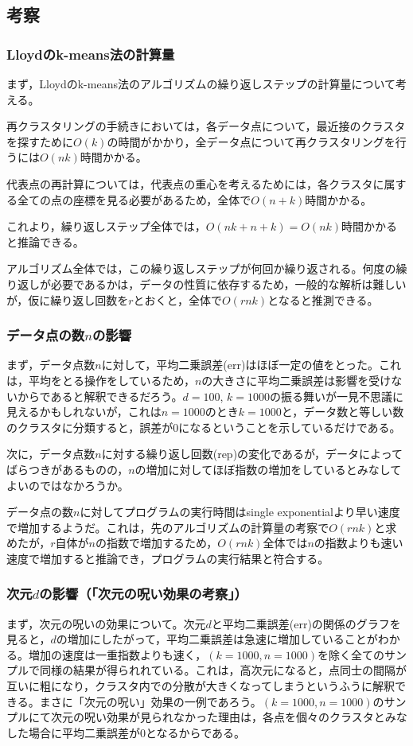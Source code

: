 \documentclass[10pt,a4,uplatex]{jsarticle}
\begin{document}
\subsection{考察}
\subsubsection{Lloydのk-means法の計算量}
まず，Lloydのk-means法のアルゴリズムの繰り返しステップの計算量について考える。

再クラスタリングの手続きにおいては，各データ点について，最近接のクラスタを探すために$O(k)$の時間がかかり，全データ点について再クラスタリングを行うには$O(nk)$時間かかる。

代表点の再計算については，代表点の重心を考えるためには，各クラスタに属する全ての点の座標を見る必要があるため，全体で$O(n + k)$時間かかる。

これより，繰り返しステップ全体では，$O(nk + n + k) = O(nk)$時間かかると推論できる。

アルゴリズム全体では，この繰り返しステップが何回か繰り返される。何度の繰り返しが必要であるかは，データの性質に依存するため，一般的な解析は難しいが，仮に繰り返し回数を$r$とおくと，全体で$O(rnk)$となると推測できる。

\subsubsection{データ点の数$n$の影響}
まず，データ点数$n$に対して，平均二乗誤差(err)はほぼ一定の値をとった。これは，平均をとる操作をしているため，$n$の大きさに平均二乗誤差は影響を受けないからであると解釈できるだろう。$d = 100$, $k = 1000$の振る舞いが一見不思議に見えるかもしれないが，これは$n = 1000$のとき$k = 1000$と，データ数と等しい数のクラスタに分類すると，誤差が$0$になるということを示しているだけである。

次に，データ点数$n$に対する繰り返し回数(rep)の変化であるが，データによってばらつきがあるものの，$n$の増加に対してほぼ指数の増加をしているとみなしてよいのではなかろうか。

データ点の数$n$に対してプログラムの実行時間はsingle exponentialより早い速度で増加するようだ。これは，先のアルゴリズムの計算量の考察で$O(rnk)$と求めたが，$r$自体が$n$の指数で増加するため，$O(rnk)$全体では$n$の指数よりも速い速度で増加すると推論でき，プログラムの実行結果と符合する。

\subsubsection{次元$d$の影響（「次元の呪い効果の考察」）}
まず，次元の呪いの効果について。次元$d$と平均二乗誤差(err)の関係のグラフを見ると，$d$の増加にしたがって，平均二乗誤差は急速に増加していることがわかる。増加の速度は一重指数よりも速く，$(k = 1000, n = 1000)$を除く全てのサンプルで同様の結果が得られれている。これは，高次元になると，点同士の間隔が互いに粗になり，クラスタ内での分散が大きくなってしまうというふうに解釈できる。まさに「次元の呪い」効果の一例であろう。$(k = 1000, n = 1000)$のサンプルにて次元の呪い効果が見られなかった理由は，各点を個々のクラスタとみなした場合に平均二乗誤差が0となるからである。
\end{document}
